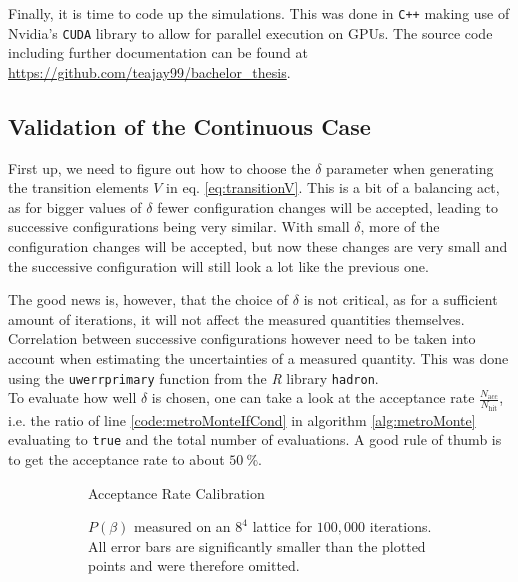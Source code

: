 Finally, it is time to code up the simulations. This was done in \texttt{C++} making use of Nvidia's \texttt{CUDA} library to allow for parallel execution on GPUs. The source code including further documentation can be found at \url{https://github.com/teajay99/bachelor_thesis}.\\

\subsection{Validation of the Continuous Case}

First up, we need to figure out how to choose the $\delta$ parameter when generating the transition elements $V$ in eq. \ref{eq:transitionV}. This is a bit of a balancing act, as for bigger values of $\delta$ fewer configuration changes will be accepted, leading to successive configurations being very similar. With small $\delta$, more of the configuration changes will be accepted, but now these changes are very small and the successive configuration will still look a lot like the previous one.

The good news is, however, that the choice of $\delta$ is not critical, as for a sufficient amount of iterations, it will not affect the measured quantities themselves. Correlation between successive configurations however need to be taken into account when estimating the uncertainties of a measured quantity. This was done using the \texttt{uwerrprimary} function from the \emph{R} library \texttt{hadron}.\\

To evaluate how well $\delta$ is chosen, one can take a look at the acceptance rate $\frac{N_{\textrm{acc}}}{N_{\textrm{hit}}}$, i.e. the ratio of line \ref{code:metroMonteIfCond} in algorithm \ref{alg:metroMonte} evaluating to \texttt{true} and the total number of evaluations. A good rule of thumb is to get the acceptance rate to about $\SI{50}{\%}$.
\begin{figure}[!hbt]
 \centering
 \begin{subfigure}[t]{0.49\textwidth}
  
  \caption{Acceptance Rate Calibration}
  \label{plot:calibHitRate}
 \end{subfigure}
 \begin{subfigure}[t]{0.49\textwidth}
  
  \caption{$P(\beta)$ measured on an $8^4$ lattice for $100,000$ iterations. All error bars are significantly smaller than the plotted points and were therefore omitted.}
  \label{plot:refDataSet}
 \end{subfigure}
 \caption{}
\end{figure}

